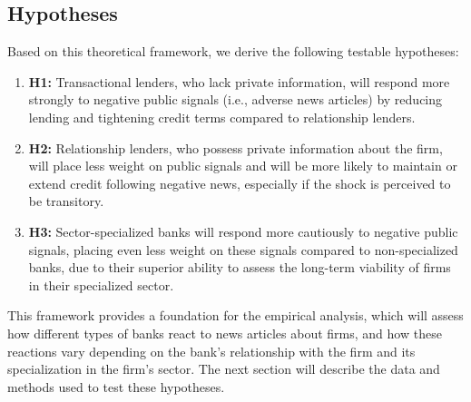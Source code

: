 \subsection{Hypotheses}

Based on this theoretical framework, we derive the following testable hypotheses:
\begin{enumerate}
    \item \textbf{H1:} Transactional lenders, who lack private information, will respond more strongly to negative public signals (i.e., adverse news articles) by reducing lending and tightening credit terms compared to relationship lenders.
    
    \item \textbf{H2:} Relationship lenders, who possess private information about the firm, will place less weight on public signals and will be more likely to maintain or extend credit following negative news, especially if the shock is perceived to be transitory.
    
    \item \textbf{H3:} Sector-specialized banks will respond more cautiously to negative public signals, placing even less weight on these signals compared to non-specialized banks, due to their superior ability to assess the long-term viability of firms in their specialized sector.
\end{enumerate}

This framework provides a foundation for the empirical analysis, which will assess how different types of banks react to news articles about firms, and how these reactions vary depending on the bank's relationship with the firm and its specialization in the firm's sector. The next section will describe the data and methods used to test these hypotheses.
